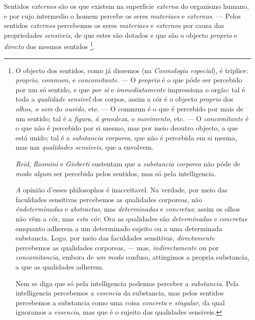 Sentidos \emph{externos} são os que existem na superficie \emph{externa} do organismo humano, e por cujo intermedio o homem percebe os seres \emph{materiaes} e \emph{externos}. --- Pelos sentidos \emph{externos} percebemos os seres \emph{materiaes} e \emph{externos} por causa das propriedades \emph{sensiveis}, de que estes são dotados e que são o objecto \emph{proprio} e \emph{directo} dos mesmos sentidos \footnote{O objecto dos sentidos, como já dissemos (na \emph{Cosmologia especial}), é triplice: \emph{proprio}, \emph{commum}, e \emph{concomitante}. --- O \emph{proprio} é o que póde ser percebido por um só sentido, e que \emph{por si} e \emph{immediatamente} impressiona o orgão: tal é toda a \emph{qualidade sensivel} dos corpos, assim a cór é o objecto \emph{proprio} dos \emph{olhos}, \emph{o som} do \emph{ouvido}, ete. --- O commum é o que é percebido por mais de um sentido; tal é a \emph{figura}, \emph{á grandeza}, o \emph{movimento}, etc. --- O \emph{concomitante} é o que não é percebido por si mesmo, mas por meio deoutro objecto, a que está unido; tal é a \emph{substancia corporea}, que não é percebida em si mesma, mas nas \emph{qualidades sensiveis}, que a envolvem.\par \emph{Reid}, \emph{Rosmini} e \emph{Gioberti} sustentam que a \emph{substancia corporea} não póde de \emph{modo algum} ser percebida pelos sentidos, mas só pela intelligencia.\par \emph{A} opinião d'esses philosophos é inacceitavel. Na verdade, por meio das faculdades sensitivas percebemos as qualidades corporeas, não \emph{éndeterminadas} e \emph{abstractas}, mas \emph{determinadas} e \emph{concretas}; assim os olhos não vêm a cór, mas \emph{esta cór}. Ora as qualidades são \emph{determinadas} e \emph{concretas} emquanto adherem a um determinado sujeito ou a uma determinada substancia. Logo, por meio das faculdades sensitivas, \emph{directamente} percebemos as qualidades corporeas, --- mas, \emph{indirectamente} ou por \emph{concomitancia}, embora de \emph{um modo} confuso, attingimos a propria substancia, a que as qualidades adherem.\par Nem se diga que só pela intelligencia podemos perceber a \emph{substancia}. Pela intelligencia percebemos a \emph{essencia} da substancia, mas pelos sentidos percebemos a substancia como uma coisa \emph{concreta} e \emph{singular}, da qual ignoramos a \emph{essencia}, mas que é o sujeito das qualidades sensiveis.}.


